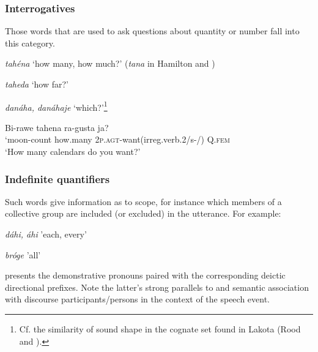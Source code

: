 \documentclass[output=paper]{LSP/langsci}
\begin{document}
\subsubsection{Interrogatives}

Those words that are used to ask questions about quantity or number fall into this category.  

\hspace{2em} \textit{tah\'ena} `how many, how much?'       (\textit{tana} in Hamilton and \citealt{Irvin1848})

\hspace{2em} \textit{taheda}  `how far?'  

\hspace{2em} \textit{danáha, danáhaje}  `which?'\footnote{Cf. the similarity of sound shape in the cognate set found in Lakota (Rood and \citealt[455-457]{Taylor1996}).}


\ea  \gll Bi-rawe   tahena   ra-gusta         		 ja? 	\\			          		
`moon-count  how.many    2\textsc{p.agt}-want(irreg.verb.2/s-/) Q.\textsc{fem}	\\					
\glt `How many calendars do you want?'  
\z

\subsubsection{Indefinite quantifiers}  

Such words give information as to scope, for instance which members of a collective group are included (or excluded) in the utterance. For example:  

\hspace{2em} \textit{dáhi, áhi}  'each, every'

\hspace{2em} \textit{br\'oge}  'all'
       								                   	 
 presents the demonstrative pronouns paired with the corresponding deictic directional prefixes.  Note the latter's strong parallels to and semantic association with discourse participants/persons in the context of the speech event.
\end{document}
